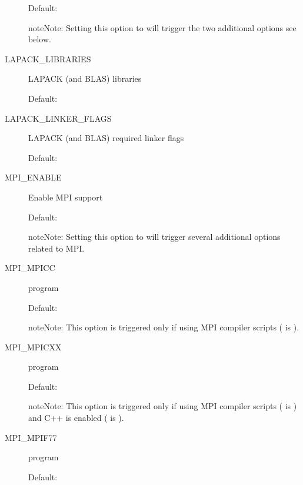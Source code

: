 \documentclass[letterpaper,10pt,english]{sphinxmanual}
\begin{document}
\begin{description}
Default: 

\begin{notice}{note}{Note:}
Setting this option to  will trigger the two additional
options see below.
\end{notice}

\item[{\index{LAPACK\_LIBRARIES (CMake option)}LAPACK\_LIBRARIES}] \leavevmode
LAPACK (and BLAS) libraries

Default: 

\item[{\index{LAPACK\_LINKER\_FLAGS (CMake option)}LAPACK\_LINKER\_FLAGS}] \leavevmode
LAPACK (and BLAS) required linker flags

Default: 

\item[{\index{MPI\_ENABLE (CMake option)}MPI\_ENABLE}] \leavevmode
Enable MPI support

Default: 

\begin{notice}{note}{Note:}
Setting this option to  will trigger several additional
options related to MPI.
\end{notice}

\item[{\index{MPI\_MPICC (CMake option)}MPI\_MPICC}] \leavevmode
{} program

Default: 

\begin{notice}{note}{Note:}
This option is triggered only if using MPI compiler scripts
( is ).
\end{notice}

\item[{\index{MPI\_MPICXX (CMake option)}MPI\_MPICXX}] \leavevmode
{} program

Default:

\begin{notice}{note}{Note:}
This option is triggered only if using MPI compiler scripts
( is ) and C++ is enabled
( is ).
\end{notice}

\item[{\index{MPI\_MPIF77 (CMake option)}MPI\_MPIF77}] \leavevmode
{} program

Default: 


\end{description}
\end{document}
